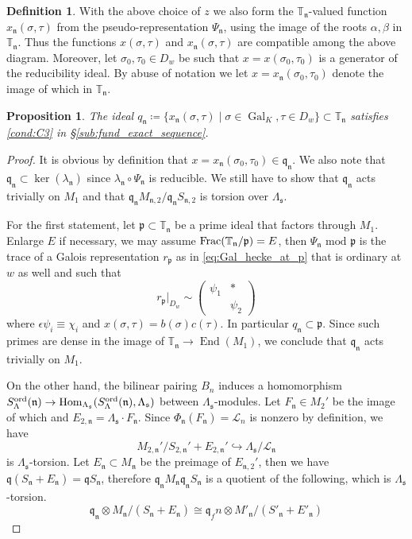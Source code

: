 \documentclass[leqno]{amsart}
\newcommand{\smat}[1]{\left( \begin{smallmatrix} #1 \end{smallmatrix} \right)}
\newcommand{\TT}{\mathbb{T}} %
\DeclareMathOperator{\Gal}{Gal}
\newcommand{\ord}{\textnormal{ord}}
\newcommand{\fs}{\mathfrak{s}}
\newcommand{\fn}{\mathfrak{n}}
\newcommand{\fp}{\mathfrak{p}}
\newcommand{\fq}{\mathfrak{q}}
\DeclareMathOperator{\End}{End}
\DeclareMathOperator{\Hom}{Hom}
\newtheorem{prop}[thm]{Proposition}
\theoremstyle{definition}
\newtheorem{defn}[thm]{Definition}
\theoremstyle{remark}
\begin{document}
\begin{defn}
With the above choice of $z$
we also form the $\TT_\fn$-valued
function  $x_\fn(\sigma,\tau)$ 
from the pseudo-representation $\Psi_\fn$,
using the image of the roots  $\alpha,\beta$ in  $\TT_\fn$.
Thus the functions $x(\sigma,\tau)$
and  $x_\fn(\sigma,\tau)$ are compatible 
among the above diagram.
Moreover,
let $\sigma_0,\tau_0\in D_w$
be such that $ x=x(\sigma_0,\tau_0)$
is a generator of the reducibility ideal.
By abuse of notation we let
$x=x_\fn(\sigma_0,\tau_0)$
denote the image of which in $\TT_\fn$.
\end{defn}

\begin{prop}

The ideal 
$q_{\fn}\coloneqq
\{x_\fn(\sigma,\tau)\mid\sigma\in\Gal_K, \tau\in D_w\}
\subset \TT_\fn$
satisfies \ref{cond:C3}
in \S\ref{sub:fund_exact_sequence}.

\end{prop}

\begin{proof}

It is obvious by definition
that $x=x_\fn(\sigma_0,\tau_0)\in \fq_\fn$.
We also note that 
$\fq_\fn\subset\ker(\lambda_\fn)$
since  $\lambda_\fn\circ\Psi_\fn$ is reducible.
We still have to show that
$\fq_\fn$ acts trivially on  $M_1$
and that 
$\fq_\fn M_{\fn,2}/\fq_\fn S_{\fn,2}$
is torsion over $\Lambda_{\fs}$.

For the first statement,
let $\fp\subset \TT_\fn$
be a prime ideal that 
factors through  $M_1$. 
Enlarge $E$ if necessary,
we may assume  $\textnormal{Frac}(\TT_\fn/\fp)=E$,
then  $\Psi_\fn\text{ mod }\fp$
is the trace of a Galois representation  $r_{\fp}$
as in \eqref{eq:Gal_hecke_at_p}
that is ordinary at $w$ as well and such that
\[
	r_\fp\vert_{D_w}\sim
	\smat{\psi_1&*\\&\psi_2}
\]
where $\epsilon\psi_i\equiv \chi_i$
and $x(\sigma,\tau)=b(\sigma)c(\tau)$.
In particular $q_\fn\subset \fp$.
Since such primes are dense in the image
of $\TT_{\fn}\to \End(M_1)$,
we conclude that $\fq_{\fn}$ acts trivially on $M_1$.

On the other hand,
the bilinear pairing $B_n$ induces
a homomorphism 
$S^{\ord}_\Lambda(\fn)\to\Hom_{\Lambda_{\fs}}
(S^{\ord}_\Lambda(\fn),\Lambda_{\fs})$
between $\Lambda_{\fs}$-modules.
Let $F_\fn\in M_2'$ be the image of which
and $E_{2,\fn}=\Lambda_{\fs}\cdot F_\fn$.
Since  $\Phi_\fn(F_{\fn})=\mathcal{L}_n$ is nonzero 
by definition, we have
\[
	M_{2,\fn}'/S_{2,\fn}'+E_{2,\fn}'\hookrightarrow
	\Lambda_{\fs}/\mathcal{L}_{\fn}
\]
is $\Lambda_{\fs}$-torsion.
Let $E_{\fn}\subset M_{\fn}$ be the 
preimage of $E_{\fn,2}'$,
then we have $\fq(S_\fn+E_\fn)=\fq S_\fn$, 
therefore 
$\fq_{\fn}M_{\fn}\fq_{\fn}S_{\fn}$ is a quotient of
the following, which is $\Lambda_{\fs}$-torsion.
\[
	\fq_\fn\otimes 
	M_\fn/(S_\fn+E_\fn)\cong 
	\fq_fn\otimes 
	M'_\fn/(S'_\fn+E'_\fn)
\]
\end{proof}
\end{document}
